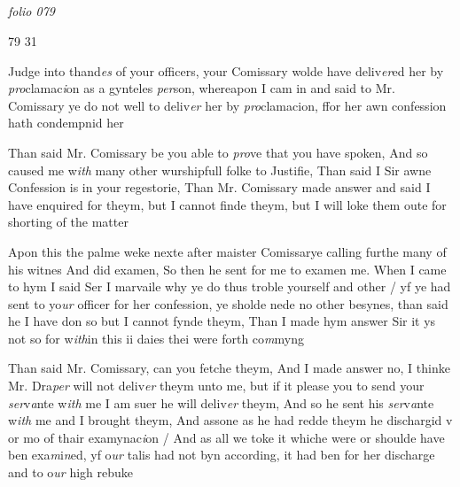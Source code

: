 \documentclass[12pt, a4paper]{book}
\begin{document}
\dotfill
						\newpage {} \subsection*{}

\textit{folio 079}


\begin{flushright}{\color{Mahogany}79} 31\end{flushright}
	
		\ifthenelse{\isodd{\thepage}}
		{\reversemarginpar}
		{\normalmarginpar}
		Judge into thand\textit{es} of your officers, your Comissary
 wolde have deliv\textit{er}ed her by \textit{pro}clamac\textit{i}on as a gynteles
		\textit{per}son, whereapon I cam in and said to Mr. Comissary
 ye do not well to deliv\textit{er} her by \textit{pro}clamacion, ffor her
 awn confession hath condempnid her
	
				\marginpar[\vspace{0.5cm}{\textcolor{Gray}{n}}]{}
			
		
		\ifthenelse{\isodd{\thepage}}
		{\reversemarginpar}
		{\normalmarginpar}
		Than said Mr. Comissary be you able to \textit{pro}ve that
 you have spoken, And so caused me w\textit{ith} many other
 wurshipfull folke to Justifie, Than said I Sir awne
			Confession is in your regestorie, Than Mr. Comissary
  made answer and said I have enquired for theym, but
 I cannot finde theym, but I will loke them oute for
 shorting of the matter
	
		
				\marginpar[\vspace{0.5cm}{\textcolor{Gray}{n}}]{}
			
		
		\ifthenelse{\isodd{\thepage}}
		{\reversemarginpar}
		{\normalmarginpar}
		Apon this the palme weke nexte after maister
			Comissarye calling furthe many of his witnes
 And did examen, So then he sent for me to examen
 me. When I came to hym I said Ser I marvaile
 why ye do thus troble yourself and other / yf ye
 had sent to yo\textit{ur }officer for her confession, ye sholde nede
  no other besynes, than said he I have don so but I
 cannot fynde theym, Than I made hym answer Sir
 it ys not so for w\textit{ith}in this ii daies thei were forth co\textit{m}myng
	
	
		\ifthenelse{\isodd{\thepage}}
		{\reversemarginpar}
		{\normalmarginpar}
		Than said Mr. Comissary, can you fetche theym, And
		I made answer no, I thinke Mr. Dra\textit{per} will not deliv\textit{er}
 theym unto me, but if it please you to send your \textit{ser}v\textit{a}nte
 w\textit{ith} me I am suer he will deliv\textit{er} theym, And so he sent
 his \textit{ser}v\textit{a}nte w\textit{ith} me and I brought theym, And assone as
 he had redde theym he dischargid v or mo of thair
 examynac\textit{i}on / And as all we toke it whiche were or
 shoulde have ben exa\textit{m}i\textit{n}ed, yf o\textit{ur} talis had not byn
 according, it had ben for her discharge and to o\textit{ur} high
 rebuke
 
\end{document}
